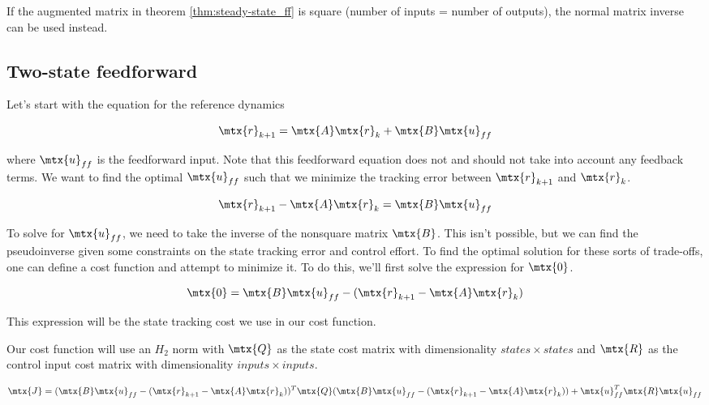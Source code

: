 If the augmented matrix in theorem \ref{thm:steady-state_ff} is square (number
of \glspl{input} = number of \glspl{output}), the normal matrix inverse can be
used instead.

\subsection{Two-state feedforward}

Let's start with the equation for the \gls{reference} dynamics

\begin{equation*}
  \mtx{r}_{k+1} = \mtx{A}\mtx{r}_k + \mtx{B}\mtx{u}_{ff}
\end{equation*}

where $\mtx{u}_{ff}$ is the feedforward input. Note that this feedforward
equation does not and should not take into account any feedback terms. We want
to find the optimal $\mtx{u}_{ff}$ such that we minimize the \gls{tracking}
error between $\mtx{r}_{k+1}$ and $\mtx{r}_k$.

\begin{equation*}
  \mtx{r}_{k+1} - \mtx{A}\mtx{r}_k = \mtx{B}\mtx{u}_{ff}
\end{equation*}

To solve for $\mtx{u}_{ff}$, we need to take the inverse of the nonsquare matrix
$\mtx{B}$. This isn't possible, but we can find the pseudoinverse given some
constraints on the \gls{state} \gls{tracking} error and \gls{control effort}. To
find the optimal solution for these sorts of trade-offs, one can define a cost
function and attempt to minimize it. To do this, we'll first solve the
expression for $\mtx{0}$.

\begin{equation*}
  \mtx{0} = \mtx{B}\mtx{u}_{ff} - (\mtx{r}_{k+1} - \mtx{A}\mtx{r}_k)
\end{equation*}

This expression will be the \gls{state} \gls{tracking} cost we use in our cost
function.

Our cost function will use an $H_2$ norm with $\mtx{Q}$ as the \gls{state} cost
matrix with dimensionality $states \times states$ and $\mtx{R}$ as the
\gls{control input} cost matrix with dimensionality $inputs \times inputs$.

\begin{equation*}
  \mtx{J} = (\mtx{B}\mtx{u}_{ff} - (\mtx{r}_{k+1} - \mtx{A}\mtx{r}_k))^T \mtx{Q}
    (\mtx{B}\mtx{u}_{ff} - (\mtx{r}_{k+1} - \mtx{A}\mtx{r}_k)) +
    \mtx{u}_{ff}^T\mtx{R}\mtx{u}_{ff}
\end{equation*}

